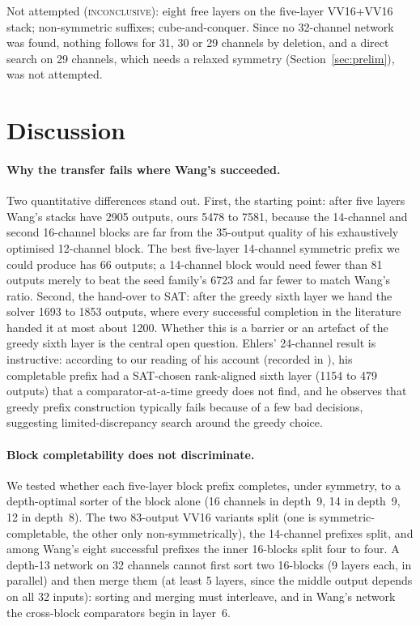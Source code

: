 \documentclass[11pt,a4paper]{article}
\theoremstyle{plain}
\theoremstyle{definition}
\theoremstyle{remark}
\newcommand{\INC}{\textsc{inconclusive}}
\begin{document}
Not attempted (\INC): eight free layers on the five-layer VV16+VV16 stack; non-symmetric suffixes; cube-and-conquer. Since no 32-channel network was found, nothing follows for 31, 30 or 29 channels by deletion, and a direct search on 29 channels, which needs a relaxed symmetry (Section~\ref{sec:prelim}), was not attempted.

\section{Discussion}\label{sec:discussion}

\paragraph{Why the transfer fails where Wang's succeeded.} Two quantitative differences stand out. First, the starting point: after five layers Wang's stacks have 2905 outputs, ours 5478 to 7581, because the 14-channel and second 16-channel blocks are far from the 35-output quality of his exhaustively optimised 12-channel block. The best five-layer 14-channel symmetric prefix we could produce has 66 outputs; a 14-channel block would need fewer than 81 outputs merely to beat the seed family's 6723 and far fewer to match Wang's ratio. Second, the hand-over to SAT: after the greedy sixth layer we hand the solver 1693 to 1853 outputs, where every successful completion in the literature handed it at most about 1200. Whether this is a barrier or an artefact of the greedy sixth layer is the central open question. Ehlers' 24-channel result is instructive: according to our reading of his account (recorded in ), his completable prefix had a SAT-chosen rank-aligned sixth layer (1154 to 479 outputs) that a comparator-at-a-time greedy does not find, and he observes that greedy prefix construction typically fails because of a few bad decisions, suggesting limited-discrepancy search around the greedy choice.

\paragraph{Block completability does not discriminate.} We tested whether each five-layer block prefix completes, under symmetry, to a depth-optimal sorter of the block alone (16 channels in depth~9, 14 in depth~9, 12 in depth~8). The two 83-output VV16 variants split (one is symmetric-completable, the other only non-symmetrically), the 14-channel prefixes split, and among Wang's eight successful prefixes the inner 16-blocks split four to four. A depth-13 network on 32 channels cannot first sort two 16-blocks (9 layers each, in parallel) and then merge them (at least 5 layers, since the middle output depends on all 32 inputs): sorting and merging must interleave, and in Wang's network the cross-block comparators begin in layer~6.
\end{document}
